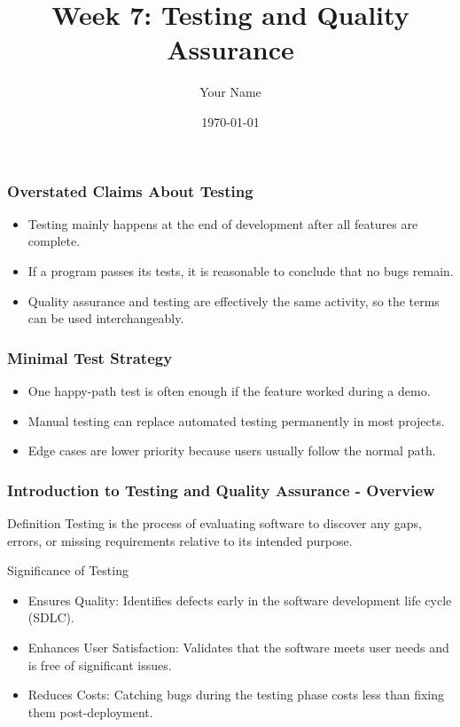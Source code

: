 \documentclass{beamer}
\title{Week 7: Testing and Quality Assurance}
\author{Your Name}
\institute{Your Institution}
\date{\today}
\begin{document}
\frame{\titlepage}

\begin{frame}[fragile]
    \frametitle{Overstated Claims About Testing}
    \begin{itemize}
        \item Testing mainly happens at the end of development after all features are complete.
        \item If a program passes its tests, it is reasonable to conclude that no bugs remain.
        \item Quality assurance and testing are effectively the same activity, so the terms can be used interchangeably.
    \end{itemize}
\end{frame}

\begin{frame}[fragile]
    \frametitle{Minimal Test Strategy}
    \begin{itemize}
        \item One happy-path test is often enough if the feature worked during a demo.
        \item Manual testing can replace automated testing permanently in most projects.
        \item Edge cases are lower priority because users usually follow the normal path.
    \end{itemize}
\end{frame}

\begin{frame}[fragile]
    \frametitle{Introduction to Testing and Quality Assurance - Overview}
    \begin{block}{Definition}
        Testing is the process of evaluating software to discover any gaps, errors, or missing requirements relative to its intended purpose.
    \end{block}

    \begin{block}{Significance of Testing}
        \begin{itemize}
            \item Ensures Quality: Identifies defects early in the software development life cycle (SDLC).
            \item Enhances User Satisfaction: Validates that the software meets user needs and is free of significant issues.
            \item Reduces Costs: Catching bugs during the testing phase costs less than fixing them post-deployment.
        \end{itemize}
    \end{block}
\end{frame}
\end{document}
